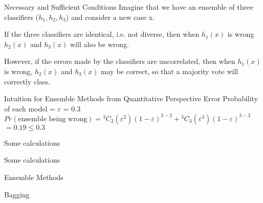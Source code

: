 \documentclass{beamer}
\newcommand*{\Comb}[2]{{}^{#1}C_{#2}}%
\begin{document}
\begin{frame}{Necessary and Sufficient Conditions}
  Imagine that we have an ensemble of three classifiers ($h_1, h_2, h_3$) and consider a new case x.


  \pause If the three classifiers are identical, i.e.
  not diverse, then when $h_1(x)$ is wrong $h_2(x)$ and $h_3(x)$ will also be wrong.


  \pause However, if the errors made by the classifiers are uncorrelated, then when $h_1(x)$
  is wrong, $h_2(x)$ and $h_3(x)$ may be correct, so that a majority vote will correctly
  class.

\end{frame}
\begin{frame}{Intuition for Ensemble Methods from Quantitative Perspective}
  \pause Error Probability of each model = $\varepsilon$ = 0.3\\
  \vspace{1cm}
  $Pr(\text{ensemble being wrong}) = \Comb{3}{2}(\varepsilon^2)(1-\varepsilon)^{3-2} + \Comb{3}{3}(\varepsilon^3)(1-\varepsilon)^{3-3}$\\
  \vspace{0.5cm}
  \hspace{4.4cm}$ = 0.19 \leq 0.3$
\end{frame}

\begin{frame}{Some calculations}
  
\end{frame}

\begin{frame}{Some calculations}
  
\end{frame}
\begin{frame}{Ensemble Methods}
\end{frame}

\begin{frame}{Bagging}
\end{frame}
\end{document}
